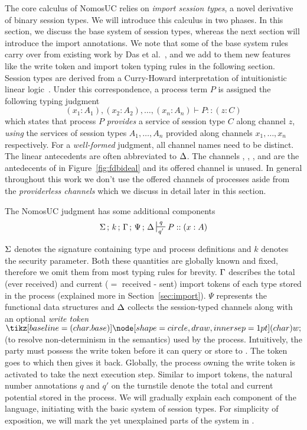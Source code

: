 
The core calculus of NomosUC relies on \emph{import session types}, a novel derivative of
binary session types.
We will introduce this calculus in two phases.
In this section, we discuss the base system of session types, whereas the next section
will introduce the import annotations.
We note that some of the base system rules carry over from existing work by Das et al.~\cite{Das20FSCD}, and we add to them new features like the write token and import token typing rules in the following section. 
Session types are derived from a Curry-Howard interpretation of intuitionistic linear logic~\cite{girard1987linear}.
Under this correspondence, a process term $P$ is assigned the following typing judgment
\[
(x_1 : A_1), (x_2 : A_2), \ldots, (x_n : A_n) \vdash P :: (z : C)
\]
which states that process $P$ \emph{provides} a service
of session type $C$ along channel $z$, \emph{using} the services of session
types $A_1, \ldots, A_n$ provided along channels $x_1, \ldots, x_n$ respectively.
For a \emph{well-formed} judgment, all channel names need to be distinct.
The linear antecedents are often abbreviated to $\Delta$.
The channels , , , and  are the antedecents of \Fdb in Figure~\ref{fig:fdbideal}
and its offered channel  is unused.
In general throughout this work we don't use the offered channels of processes 
aside from the \emph{providerless channels} which we discuss in detail later in this
section. 

The NomosUC judgment has some additional components
\[
\Sg \semi k \semi \Tokens \semi \Psi \semi \D \entailpot{q}{q'} P :: (x : A)
\]

$\Sigma$ denotes the signature containing type and process definitions and $k$
denotes the security parameter.
Both these quantities are globally known and fixed, therefore we omit them from
most typing rules for brevity.
$\Gamma$ describes the total (ever received) and current ($=$ received - sent) import tokens
of each type stored in the process (explained more in Section~\ref{sec:import}).
$\Psi$ represents the functional data structures and $\Delta$ collects the
session-typed channels along with an optional \emph{write token} $\wt$
(to resolve non-determinism in the semantics) used by the process.
Intuitively, the party must possess the write token before it can 
query or store to \Fdb. The token goes to \Fdb which then gives it back.
Globally, the process owning the write token is activated to take the
next execution step.
Similar to import tokens, the natural number annotations $q$ and $q'$ on the turnstile
denote the total and current potential stored in the process.
We will gradually explain each component of the language, initiating
with the basic system of session types.
For simplicity of exposition, we will mark the yet unexplained
parts of the system in .

